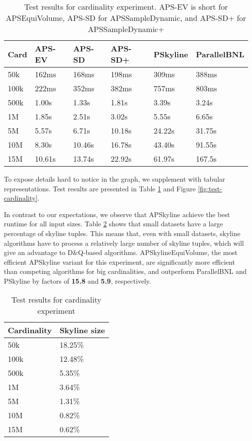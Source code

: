\documentclass[12pt,a4paper,twoside]{report}
\begin{document}
\begin{table}[H]
	\centering
	\begin{tabular}{l|lllll}
		\hline
		\textbf{Card} & 
		\textbf{APS-EV} &
		\textbf{APS-SD} & 
		\textbf{APS-SD+} & 
		\textbf{PSkyline} &
		\textbf{ParallelBNL} \\
		\hline
		50k  & 162ms  & 168ms  & 198ms  & 309ms  & 388ms \\
		100k & 222ms  & 352ms  & 382ms  & 757ms  & 803ms \\
		500k & 1.00s  & 1.33s  & 1.81s  & 3.39s  & 3.24s \\
		1M   & 1.85s  & 2.51s  & 3.02s  & 5.55s  & 6.65s \\
		5M   & 5.57s  & 6.71s  & 10.18s & 24.22s & 31.75s \\
		10M  & 8.30s  & 10.46s & 16.78s & 43.40s & 91.55s \\
		15M  & 10.61s & 13.74s & 22.92s & 61.97s & 167.5s \\
		\hline
	\end{tabular}
	\caption{Test results for cardinality experiment. APS-EV is
	short for APSEquiVolume, APS-SD for APSSampleDynamic, and
	APS-SD+ for APSSampleDynamic+}
	\label{tab:test-cardinality}
\end{table}

To expose details hard to notice in the graph, we supplement with
tabular representations. Test results are presented in Table
\ref{tab:test-cardinality} and Figure \ref{fig:test-cardinality}. 

In contrast to our expectations, we observe that APSkyline achieve the
best runtime for all input sizes. Table
\ref{tab:test-cardinality-skysize} shows that small datasets have a
large percentage of skyline tuples. This means that, even with small
datasets, skyline algorithms have to process a relatively large
number of skyline tuples, which will give an advantage to D\&Q-based
algorithms. APSkylineEquiVolume, the most efficient APSkyline variant
for this experiment, are significantly more efficient than competing
algorithms for big cardinalities, and outperform ParallelBNL and
PSkyline by factors of \textbf{15.8} and \textbf{5.9},
respectively.

\begin{table}[H]
	\centering
	\begin{tabular}{ll}
		\hline
		\textbf{Cardinality} & 
		\textbf{Skyline size} \\
		\hline
		50k  & 18.25\% \\
		100k & 12.48\% \\
		500k & 5.35\%  \\
		1M   & 3.64\%  \\
		5M   & 1.31\%  \\
		10M  & 0.82\%  \\
		15M  & 0.62\%  \\
		\hline
	\end{tabular}
	\caption{Test results for cardinality experiment}
	\label{tab:test-cardinality-skysize}
\end{table}
\end{document}
